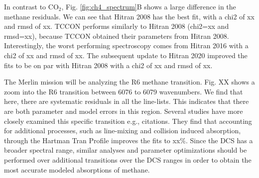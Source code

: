 \documentclass[amt, manuscript]{copernicus}
\begin{document}
In contrast to CO$_2$, Fig. \ref{fig:ch4_spectrum}B shows a large difference in the methane residuals. We can see that Hitran 2008 has the best fit, with a chi2 of xx and rmsd of xx. TCCON performs similarly to Hitran 2008 (chi2=xx and rmsd=xx), because TCCON obtained their parameters from Hitran 2008. Interestingly, the worst performing spectroscopy comes from Hitran 2016 with a chi2 of xx and rmsd of xx. The subsequent update to Hitran 2020 improved the fits to be on par with Hitran 2008 with a chi2 of xx and rmsd of xx.

The Merlin mission will be analyzing the R6 methane transition. Fig. XX shows a zoom into the R6 transition between 6076 to 6079 wavenumbers. We find that here, there are systematic residuals in all the line-lists. This indicates that there are both parameter and model errors in this region. Several studies have more closely examined this specific transition e.g., citations. They find that accounting for additional processes, such as line-mixing and collision induced absorption, through the Hartman Tran Profile improves the fits to xx\%. Since the DCS has a broader spectral range, similar analyses and parameter optimizations should be performed over additional transitions over the DCS ranges in order to obtain the most accurate modeled absorptions of methane. 
\end{document}

